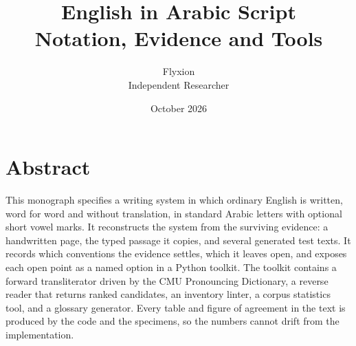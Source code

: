 \documentclass[11pt,a4paper]{book}
\title{English in Arabic Script\\[4pt]\large Notation, Evidence and Tools}
\author{Flyxion\\Independent Researcher}
\date{October 2026}
\begin{document}
\frontmatter
\maketitle
\chapter*{Abstract}
This monograph specifies a writing system in which ordinary English is written, word for word and without translation, in standard Arabic letters with optional short vowel marks. It reconstructs the system from the surviving evidence: a handwritten page, the typed passage it copies, and several generated test texts. It records which conventions the evidence settles, which it leaves open, and exposes each open point as a named option in a Python toolkit. The toolkit contains a forward transliterator driven by the CMU Pronouncing Dictionary, a reverse reader that returns ranked candidates, an inventory linter, a corpus statistics tool, and a glossary generator. Every table and figure of agreement in the text is produced by the code and the specimens, so the numbers cannot drift from the implementation.

\tableofcontents
\mainmatter













\appendix



\end{document}

